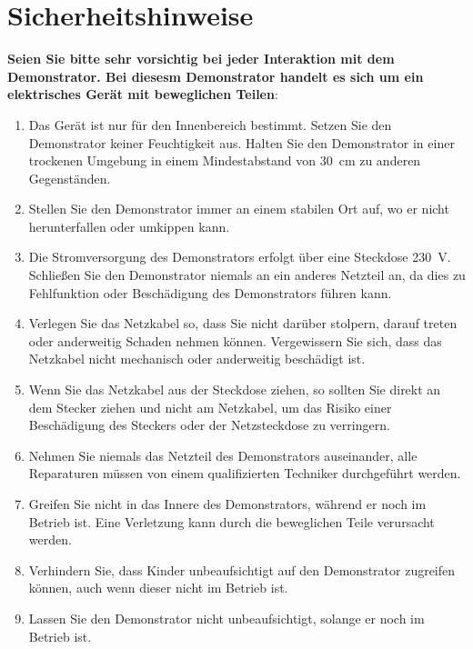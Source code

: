 %
%

\chapter{Sicherheitshinweise}


\textbf{Seien Sie bitte sehr vorsichtig bei jeder Interaktion mit dem Demonstrator. Bei diesesm Demonstrator handelt es sich um ein elektrisches Gerät mit beweglichen Teilen}:


	\begin{enumerate} \item Das Gerät ist nur für den Innenbereich bestimmt. Setzen Sie den Demonstrator keiner Feuchtigkeit aus. Halten Sie den Demonstrator in einer trockenen Umgebung in einem Mindestabstand von 30\ cm zu anderen Gegenständen.
	
				\item Stellen Sie den Demonstrator immer an einem stabilen Ort auf, wo er nicht herunterfallen oder umkippen kann.	
			
			 	\item Die Stromversorgung des Demonstrators erfolgt über eine Steckdose 230\ V. Schließen Sie den Demonstrator niemals an ein anderes Netzteil an, da dies zu Fehlfunktion oder Beschädigung des Demonstrators führen kann. 
				
				\item Verlegen Sie das Netzkabel so, dass Sie nicht darüber stolpern, darauf treten oder anderweitig Schaden nehmen können. Vergewissern Sie sich, dass das Netzkabel nicht mechanisch oder anderweitig beschädigt ist.
				 
				\item Wenn Sie das Netzkabel aus der Steckdose ziehen, so sollten Sie direkt an dem Stecker ziehen und nicht am Netzkabel, um das Risiko einer Beschädigung des Steckers oder der Netzsteckdose zu verringern.
					
				\item Nehmen Sie niemals das Netzteil des Demonstrators auseinander, alle Reparaturen müssen von einem qualifizierten Techniker durchgeführt werden.
				
				\item Greifen Sie nicht in das Innere des Demonstrators, während er noch im Betrieb ist. Eine Verletzung kann durch die beweglichen Teile verursacht werden.
				
				\item Verhindern Sie, dass Kinder unbeaufsichtigt auf den Demonstrator zugreifen können, auch wenn dieser nicht im Betrieb ist. 
				
				\item Lassen Sie den Demonstrator nicht unbeaufsichtigt, solange er noch im Betrieb ist.
				
				
\end{enumerate}
